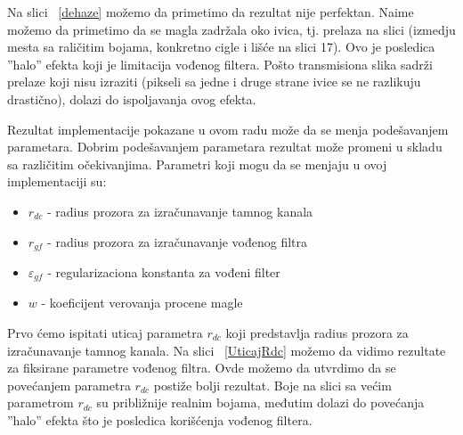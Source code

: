 \documentclass[a4paper,12pt,titlepage]{article}
\begin{document}
Na slici ~\ref{dehaze} možemo da primetimo da rezultat nije perfektan. Naime možemo da primetimo da se magla zadržala oko ivica, tj. prelaza na slici (izmedju mesta sa raličitim bojama, konkretno cigle i lišće na slici 17). Ovo je posledica ''halo'' efekta koji je limitacija vođenog filtera. Pošto transmisiona slika sadrži prelaze koji nisu izraziti (pikseli sa jedne i druge strane ivice se ne razlikuju drastično), dolazi do ispoljavanja ovog efekta.

Rezultat implementacije pokazane u ovom radu može da se menja podešavanjem parametara. Dobrim podešavanjem parametara rezultat može promeni u skladu sa različitim očekivanjima. Parametri koji mogu da se menjaju u ovoj implementaciji su:

\begin{itemize}
\item $r_{dc}$ - radius prozora za izračunavanje tamnog kanala 
\item $r_{gf}$ - radius prozora za izračunavanje vođenog filtra
\item $\varepsilon_{gf}$ - regularizaciona konstanta za vođeni filter 
\item $w$ - koeficijent verovanja procene magle
\end{itemize}

Prvo ćemo ispitati uticaj parametra $r_{dc}$ koji predstavlja radius prozora za izračunavanje tamnog kanala. Na slici ~\ref{UticajRdc} možemo da vidimo rezultate za fiksirane parametre vođenog filtra. Ovde možemo da utvrdimo da se povećanjem parametra $r_{dc}$ postiže bolji rezultat. Boje na slici sa većim parametrom $r_{dc}$ su približnije realnim bojama, međutim dolazi do povećanja ''halo'' efekta što je posledica korišćenja vođenog filtera.  
\end{document}
